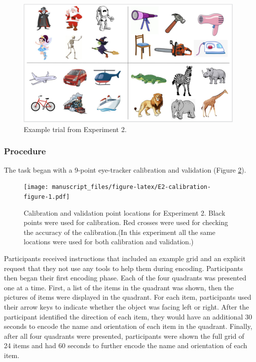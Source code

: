 \documentclass[
  man,floatsintext]{apa6}
\begin{document}
\begin{figure}
\centering
\includegraphics{group-b/E2-example-figure.jpeg}
\caption{\label{fig:E2-example-trial}Example trial from Experiment 2.}
\end{figure}

\subsubsection{Procedure}\label{procedure-2}

The task began with a 9-point eye-tracker calibration
and validation (Figure \ref{fig:E2-calibration-figure}).

\begin{figure}
\centering
\texttt{[image: manuscript\_files/figure-latex/E2-calibration-figure-1.pdf]}
\caption{\label{fig:E2-calibration-figure}Calibration and validation point locations for Experiment 2. Black points were used for calibration. Red crosses were used for checking the accuracy of the calibration.(In this experiment all the same locations were used for both calibration and validation.)}
\end{figure}

Participants received instructions that included an example grid and an explicit request that they not use any tools to help them during encoding. Participants then began their first encoding phase. Each of the four quadrants was presented one at a time. First, a list of
the items in the quadrant was shown, then the pictures of items were displayed in the quadrant.
For each item, participants used their arrow keys to indicate whether the object was facing left or right. After the participant identified the direction of each
item, they would have an additional 30 seconds to encode the name and
orientation of each item in the quadrant. Finally, after all four quadrants
were presented, participants were shown the full grid of
24 items and had 60 seconds to further encode the name and orientation
of each item.
\end{document}
